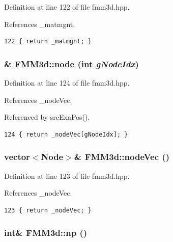 Definition at line 122 of file fmm3d.hpp.

References \_\-matmgnt.

\footnotesize\begin{verbatim}122 { return _matmgnt; }
\end{verbatim}\normalsize 


\subsubsection{\& FMM3d::node (int {\em g\-Node\-Idx})\hspace{0.3cm}{\tt  [inline]}}\label{classFMM3d_f259ccf218dbf0a04530841785f1a8b0_f259ccf218dbf0a04530841785f1a8b0}




Definition at line 124 of file fmm3d.hpp.

References \_\-node\-Vec.

Referenced by src\-Exa\-Pos().

\footnotesize\begin{verbatim}124 { return _nodeVec[gNodeIdx]; }
\end{verbatim}\normalsize 


\subsubsection{\setlength{\rightskip}{0pt plus 5cm}vector$<${\bf Node}$>$\& FMM3d::node\-Vec ()\hspace{0.3cm}{\tt  [inline]}}\label{classFMM3d_44c0c8da466878274feb4ce060c10b9b_44c0c8da466878274feb4ce060c10b9b}




Definition at line 123 of file fmm3d.hpp.

References \_\-node\-Vec.

\footnotesize\begin{verbatim}123 { return _nodeVec; }
\end{verbatim}\normalsize 


\subsubsection{\setlength{\rightskip}{0pt plus 5cm}int\& FMM3d::np ()\hspace{0.3cm}{\tt  [inline]}}\label{classFMM3d_79545716c1fbc95cbd811a65ffa9f767_79545716c1fbc95cbd811a65ffa9f767}




